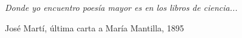
\begin{dedication}

\vspace*{1cm}

\bigskip
\bigskip

\slshape{\vspace{0.5cm}
	Donde yo encuentro poesía mayor es en los libros de ciencia...
}

\smallskip
	José Martí, última carta a María Mantilla, 1895
\end{dedication}
